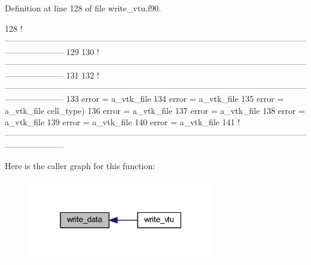 Definition at line 128 of file write\+\_\+vtu.\+f90.


\begin{DoxyCode}
128   \textcolor{comment}{
      !---------------------------------------------------------------------------------------------------------------------------------}
129   
130   \textcolor{comment}{
      !---------------------------------------------------------------------------------------------------------------------------------}
131 
132   \textcolor{comment}{
      !---------------------------------------------------------------------------------------------------------------------------------}
133   error = a\_vtk\_file%
134   error = a\_vtk\_file%
135   error = a\_vtk\_file%
      cell\_type)
136   error = a\_vtk\_file%
137   error = a\_vtk\_file%
138   error = a\_vtk\_file%
139   error = a\_vtk\_file%
140   error = a\_vtk\_file%
141   \textcolor{comment}{
      !---------------------------------------------------------------------------------------------------------------------------------}
\end{DoxyCode}
Here is the caller graph for this function\+:
\nopagebreak
\begin{figure}[H]
\begin{center}
\leavevmode
\includegraphics[width=231pt]{write__vtu_8f90_ad3d26430620662abc6caea56402b8c72_icgraph}
\end{center}
\end{figure}
\mbox{\label{write__vtu_8f90_ae39ce165900c97fc318d09bf9670ac92}} 
